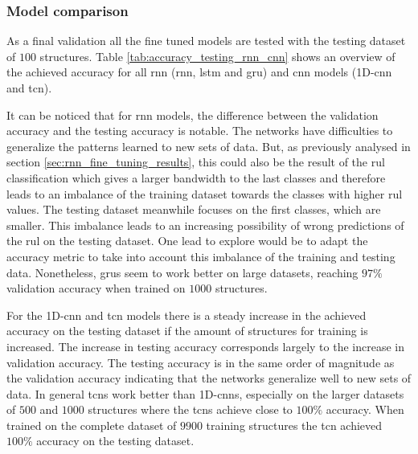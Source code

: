 \documentclass[conference]{IEEEtran}
\begin{document}
\subsubsection{Model comparison}
\label{sec:model_comparison}

As a final validation all the fine tuned models are tested with the testing dataset of $ 100 $ structures. Table \ref{tab:accuracy_testing_rnn_cnn} shows an overview of the achieved accuracy for all \gls{rnn} (\gls{rnn}, \gls{lstm} and \gls{gru}) and \gls{cnn} models (1D-\gls{cnn} and \gls{tcn}).

It can be noticed that for \gls{rnn} models, the difference between the validation accuracy and the testing accuracy is notable. The networks have difficulties to generalize the patterns learned to new sets of data. But, as previously analysed in section \ref{sec:rnn_fine_tuning_results}, this could also be the result of the \gls{rul} classification which gives a larger bandwidth to the last classes and therefore leads to an imbalance of the training dataset towards the classes with higher \gls{rul} values. The testing dataset meanwhile focuses on the first classes, which are smaller. This imbalance leads to an increasing possibility of wrong predictions of the \gls{rul} on the testing dataset. One lead to explore would be to adapt the accuracy metric to take into account this imbalance of the training and testing data. Nonetheless, \glspl{gru} seem to work better on large datasets, reaching $ 97 \% $ validation accuracy when trained on  $ 1000 $ structures.

For the 1D-\gls{cnn} and \gls{tcn} models there is a steady increase in the achieved accuracy on the testing dataset if the amount of structures for training is increased. The increase in testing accuracy corresponds largely to the increase in validation accuracy. The testing accuracy is in the same order of magnitude as the validation accuracy indicating that the networks generalize well to new sets of data. In general \glspl{tcn} work better than 1D-\glspl{cnn}, especially on the larger datasets of $ 500 $ and $ 1000 $ structures where the \glspl{tcn} achieve close to $ 100 \% $ accuracy. When trained on the complete dataset of $ 9900 $ training structures the \gls{tcn} achieved $ 100 \% $ accuracy on the testing dataset.
\end{document}
